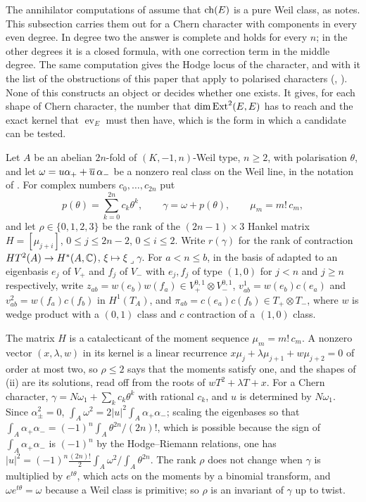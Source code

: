 The annihilator computations of \cite[Section~16]{paperI} assume that $\operatorname{ch}(E)$
is a pure Weil class, as  notes. This subsection carries
them out for a Chern character with components in every even degree. In
degree two the answer is complete and holds for every $n$; in the other
degrees it is a closed formula, with one correction term in the middle
degree. The same computation gives the Hodge locus of the character,
and with it the list of the obstructions of this paper that apply to
polarised characters (, ).
None of this constructs an object or decides whether one exists. It gives,
for each shape of Chern character, the number that $\dim\operatorname{Ext}^{2}(E,E)$ has
to reach and the exact kernel that $\operatorname{ev}_{E}$ must then have,
which is the form in which a candidate can be tested.

\begin{setupenv}\label{setup:p2prime}
Let $A$ be an abelian $2n$-fold of $(K,-1,n)$-Weil type, $n\ge2$, with
polarisation $\theta$, and let $\omega=u\alpha_{+}+\overline{u}\,\alpha_{-}$ be a
nonzero real class on the Weil line, in the notation of .
For complex numbers $c_{0},\dots,c_{2n}$ put
\[
  p(\theta)=\sum_{k=0}^{2n}c_{k}\theta^{k},\qquad
  \gamma=\omega+p(\theta),\qquad \mu_{m}=m!\,c_{m},
\]
and let $\rho\in\{0,1,2,3\}$ be the rank of the $(2n-1)\times3$ Hankel matrix
$H=[\mu_{j+i}]$, $0\le j\le2n-2$, $0\le i\le2$. Write $r(\gamma)$ for the
rank of contraction $HT^{2}(A)\to H^{*}(A,\mathbb{C})$, $\xi\mapsto\xi\lrcorner\gamma$.
For $a<n\le b$, in the basis of  adapted to an
eigenbasis $e_{j}$ of $V_{+}$ and $f_{j}$ of $V_{-}$ with $e_{j},f_{j}$ of
type $(1,0)$ for $j<n$ and $j\ge n$ respectively, write
$z_{ab}=w(e_{b})w(f_{a})\in V_{+}^{0,1}\otimes V_{-}^{0,1}$,
$v^{1}_{ab}=w(e_{b})c(e_{a})$ and $v^{2}_{ab}=w(f_{a})c(f_{b})$ in
$H^{1}(T_{A})$, and $\pi_{ab}=c(e_{a})c(f_{b})\in T_{+}\otimes T_{-}$, where
$w$ is wedge product with a $(0,1)$ class and $c$ contraction of a $(1,0)$
class.
\end{setupenv}

The matrix $H$ is a catalecticant of the moment sequence
$\mu_{m}=m!\,c_{m}$. A nonzero vector $(x,\lambda,w)$ in its kernel is a
linear recurrence $x\mu_{j}+\lambda\mu_{j+1}+w\mu_{j+2}=0$ of order at most
two, so $\rho\le2$ says that the moments satisfy one, and the shapes of
(ii) are its solutions, read off from the roots of
$wT^{2}+\lambda T+x$. For a Chern character,
$\gamma=N\omega_{1}+\sum_{k}c_{k}\theta^{k}$ with rational $c_{k}$, and $u$
is determined by $N\omega_{1}$. Since $\alpha_{\pm}^{2}=0$,
$\int_{A}\omega^{2}=2|u|^{2}\int_{A}\alpha_{+}\alpha_{-}$; scaling the
eigenbases so that $\int_{A}\alpha_{+}\alpha_{-}=(-1)^{n}\int_{A}\theta^{2n}/(2n)!$,
which is possible because the sign of $\int_{A}\alpha_{+}\alpha_{-}$ is
$(-1)^{n}$ by the Hodge--Riemann relations, one has
$|u|^{2}=(-1)^{n}\tfrac{(2n)!}{2}\int_{A}\omega^{2}\big/\!\int_{A}\theta^{2n}$.
The rank
$\rho$ does not change when
$\gamma$ is multiplied by $e^{t\theta}$, which acts on the moments by a
binomial transform, and $\omega e^{t\theta}=\omega$ because a Weil class is
primitive; so $\rho$ is an invariant of $\gamma$ up to twist.

